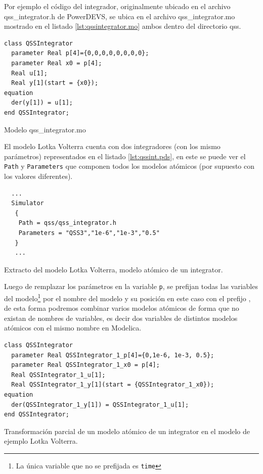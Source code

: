 	Por ejemplo el código del integrador, originalmente ubicado en el archivo qss\_integrator.h de PowerDEVS, se ubica en el archivo qss\_integrator.mo mostrado en el listado 
	\ref{lst:qssintegrator.mo} ambos dentro del directorio qss.

\begin{listing}[H]
\begin{verbatim}
class QSSIntegrator
  parameter Real p[4]={0,0,0,0,0,0,0,0};
  parameter Real x0 = p[4];
  Real u[1];
  Real y[1](start = {x0});
equation
  der(y[1]) = u[1];
end QSSIntegrator;
\end{verbatim}
\caption{Modelo qss\_integrator.mo}
\label{lst:qssintegrator.mo}
\end{listing}

	El modelo Lotka Volterra cuenta con dos integradores (con los mismo parámetros) representados en el listado \ref{lst:qssint.pds}, en este se puede ver el \texttt{Path} y \texttt{Parameters}
	que componen todos los modelos atómicos (por supuesto con los valores diferentes).

\begin{listing}[H]
\begin{verbatim}
  ...
  Simulator
   {
    Path = qss/qss_integrator.h
    Parameters = "QSS3","1e-6","1e-3","0.5"
   }
   ...
\end{verbatim}
\label{lst:qssint.pds}
\caption{Extracto del modelo Lotka Volterra, modelo atómico de un integrator.}
\end{listing}

	Luego de remplazar los parámetros en la variable \texttt{p}, se prefijan todas las variables del modelo\footnote{La única variable que no se prefijada 
	es \texttt{time}} por el nombre del modelo y su posición en este caso con el prefijo 
	, de esta forma podremos combinar varios modelos atómicos de forma que no existan  de nombres de variables,
	es decir dos variables de distintos modelos atómicos con el mismo nombre en Modelica. 

\begin{listing}[H]
\begin{verbatim}
class QSSIntegrator
  parameter Real QSSIntegrator_1_p[4]={0,1e-6, 1e-3, 0.5};
  parameter Real QSSIntegrator_1_x0 = p[4];
  Real QSSIntegrator_1_u[1];
  Real QSSIntegrator_1_y[1](start = {QSSIntegrator_1_x0});
equation
  der(QSSIntegrator_1_y[1]) = QSSIntegrator_1_u[1];
end QSSIntegrator;
\end{verbatim}
\caption{Transformación parcial de un modelo atómico de un integrator en el modelo de ejemplo Lotka Volterra.}
\end{listing}

